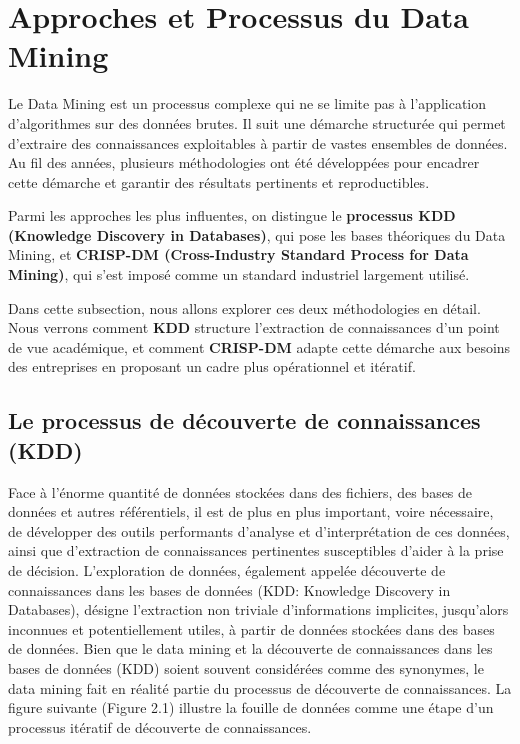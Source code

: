 \documentclass[a4paper,12pt]{article}
\begin{document}
\section{Approches et Processus du Data Mining}
    Le Data Mining est un processus complexe qui ne se limite pas à l’application d’algorithmes sur des données brutes. Il suit une démarche structurée qui permet d’extraire des connaissances exploitables à partir de vastes ensembles de données. Au fil des années, plusieurs méthodologies ont été développées pour encadrer cette démarche et garantir des résultats pertinents et reproductibles.
    
    Parmi les approches les plus influentes, on distingue le \textbf{processus KDD (Knowledge Discovery in Databases)}, qui pose les bases théoriques du Data Mining, et \textbf{CRISP-DM (Cross-Industry Standard Process for Data Mining)}, qui s’est imposé comme un standard industriel largement utilisé.
    
    Dans cette subsection, nous allons explorer ces deux méthodologies en détail. Nous verrons comment \textbf{KDD} structure l’extraction de connaissances d’un point de vue académique, et comment \textbf{CRISP-DM} adapte cette démarche aux besoins des entreprises en proposant un cadre plus opérationnel et itératif.

    \subsection{Le processus de découverte de connaissances (KDD)}
        Face à l'énorme quantité de données stockées dans des fichiers, des bases de données et autres référentiels, il est de plus en plus important, voire nécessaire, de développer des outils performants d'analyse et d'interprétation de ces données, ainsi que d'extraction de connaissances pertinentes susceptibles d'aider à la prise de décision.
        L'exploration de données, également appelée découverte de connaissances dans les bases de données (KDD: Knowledge Discovery in Databases), désigne l'extraction non triviale d'informations implicites, jusqu'alors inconnues et potentiellement utiles, à partir de données stockées dans des bases de données. Bien que le data mining et la découverte de connaissances dans les bases de données (KDD) soient souvent considérées comme des synonymes, le data mining fait en réalité partie du processus de découverte de connaissances. La figure suivante (Figure 2.1) illustre la fouille de données comme une étape d'un processus itératif de découverte de connaissances.\\
        \clearpage
\end{document}
